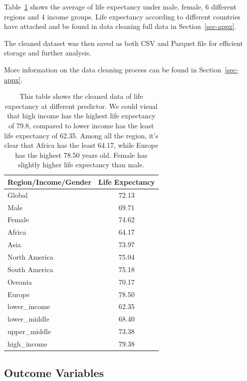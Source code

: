 \documentclass[
  letterpaper,
  DIV=11,
  numbers=noendperiod]{scrartcl}
\begin{document}
Table~\ref{tbl-sum_sta} shows the average of life expectancy under male,
female, 6 different regions and 4 income groups. Life expectancy
according to different countries have attached and be found in data
cleaning full data in Section~\ref{sec-appx}.

The cleaned dataset was then saved as both CSV and Parquet file for
efficient storage and further analysis.

More information on the data cleaning process can be found in
Section~\ref{sec-appx}.

\begingroup\fontsize{10}{12}\selectfont

\begin{longtable}[t]{lc}

\caption{\label{tbl-sum_sta}This table shows the cleaned data of life
expectancy at different predictor. We could visual that high income has
the highest life expectancy of 79.8, compared to lower income has the
least life expectancy of 62.35. Among all the region, it's clear that
Africa has the least 64.17, while Europe has the highest 78.50 years
old. Female has slightly higher life expectancy than male.}

\tabularnewline

\toprule
Region/Income/Gender & Life Expectancy\\
\midrule
Global & 72.13\\
Male & 69.71\\
Female & 74.62\\
Africa & 64.17\\
Asia & 73.97\\
\addlinespace
North America & 75.04\\
South America & 75.18\\
Oceania & 70.17\\
Europe & 78.50\\
lower\_income & 62.35\\
\addlinespace
lower\_middle & 68.40\\
upper\_middle & 73.38\\
high\_income & 79.38\\
\bottomrule

\end{longtable}

\endgroup{}

\subsection{Outcome Variables}\label{outcome-variables}
\end{document}
